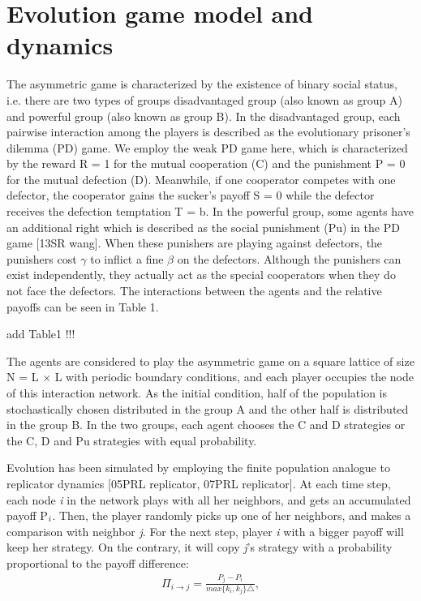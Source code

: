 \documentclass[%
 aip,
 amsmath,amssymb,
 reprint,%
]{revtex4-1}
\begin{document}
\section{\label{sec:level1}Evolution game model and dynamics}

The asymmetric game is characterized by the existence of binary social status, i.e. there are two types of groups disadvantaged group (also known as group A) and powerful group (also known as group B). In the disadvantaged group, each pairwise interaction among the players is described as the evolutionary prisoner's dilemma (PD) game. We employ the weak PD game here, which is characterized by the reward R = 1 for the mutual cooperation (C) and the punishment P = 0 for the mutual defection (D). Meanwhile, if one cooperator competes with one defector, the cooperator gains the sucker's payoff S = 0 while the defector receives the defection temptation T = b. In the powerful group, some agents have an additional right which is described as the social punishment (Pu) in the PD game [13SR wang]. When these punishers are playing against defectors, the punishers cost $\gamma$ to inflict a fine $\beta$ on the defectors. Although the punishers can exist independently, they actually act as the special cooperators when they do not face the defectors. The interactions between the agents and the relative payoffs can be seen in Table 1.


add Table1 !!!

The agents are considered to play the asymmetric game on a square lattice of size N = L $\times$ L with periodic boundary conditions, and each player occupies the node of this interaction network. As the initial condition, half of the population is stochastically chosen distributed in the group A and the other half is distributed in the group B. In the two groups, each agent chooses the C and D strategies or the C, D and Pu strategies with equal probability.

Evolution has been simulated by employing the finite population analogue to replicator dynamics [05PRL replicator, 07PRL replicator]. At each time step, each node \emph{i} in the network plays with all her neighbors, and gets an accumulated payoff P$_{\emph{i}}$. Then, the player randomly picks up one of her neighbors, and makes a comparison with neighbor \emph{j}. For the next step, player \emph{i} with a bigger payoff will keep her strategy. On the contrary, it will copy \emph{j}'s strategy with a probability proportional to the payoff difference:
\begin{eqnarray}
\Pi_{i\rightarrow j}= \frac{P_j-P_i}{max\{k_i,k_j\}\triangle},
\label{eq:one}
\end{eqnarray}
\end{document}
